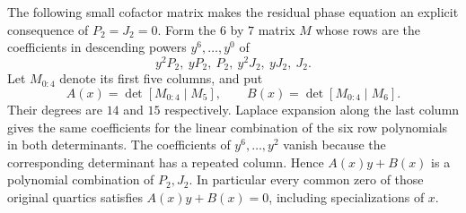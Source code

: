 \documentclass[11pt]{article}
\begin{document}
The following small cofactor matrix makes the residual phase equation
an explicit consequence of $P_2=J_2=0$. Form the $6$ by $7$ matrix
$M$ whose rows are the coefficients in descending powers
$y^6,\ldots,y^0$ of
\[
               y^2P_2,\ yP_2,\ P_2,\ y^2J_2,\ yJ_2,\ J_2.
 \tag{ANP9}
\]
Let $M_{0:4}$ denote its first five columns, and put
\[
 A(x)=\det[M_{0:4}\mid M_5],\qquad
 B(x)=\det[M_{0:4}\mid M_6].
 \tag{ANP10}
\]
Their degrees are $14$ and $15$ respectively.
Laplace expansion along the last column gives the same coefficients
for the linear combination of the six row polynomials in both
determinants. The coefficients of $y^6,\ldots,y^2$ vanish because
the corresponding determinant has a repeated column. Hence
$A(x)y+B(x)$ is a polynomial combination of $P_2,J_2$.
In particular every common zero of those original quartics satisfies
$A(x)y+B(x)=0$, including specializations of $x$.
\end{document}
